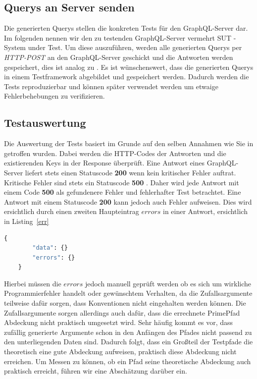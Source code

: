 \subsection{Querys an Server senden}
\label{testf}

Die generierten Querys stellen die konkreten Tests für den GraphQL-Server dar.
Im folgenden nennen wir den zu testenden GraphQL-Server vermehrt SUT - System under Test.
Um diese auszuführen, werden alle generierten Querys per \textit{HTTP-POST} an den GraphQL-Server geschickt und die Antworten
werden gespeichert, dies ist analog zu \cite{property-based-testing}.
Es ist wünschenswert, dass die generierten Querys in einem Testframework abgebildet und gespeichert werden.
Dadurch werden die Tests reproduzierbar und können später verwendet werden um etwaige Fehlerbehebungen zu verifizieren.

\subsection{Testauswertung}

Die Auswertung der Tests basiert im Grunde auf den selben Annahmen wie Sie in \cite{property-based-testing} getroffen wurden.
Dabei werden die HTTP-Codes der Antworten und die existierenden Keys in der Response überprüft.
Eine Antwort eines GraphQL-Server liefert stets einen Statuscode \textbf{200} wenn kein kritischer Fehler auftrat.
Kritische Fehler sind stets ein Statuscode \textbf{500} \cite[vgl. 7. Response]{graphqlspecification}.
Daher wird jede Antwort mit einem Code \textbf{500} als gefundenere Fehler und fehlerhafter Test betrachtet.
Eine Antwort mit einem Statuscode \textbf{200} kann jedoch auch Fehler aufweisen.
Dies wird ersichtlich durch einen zweiten Haupteintrag $errors$ in einer Antwort, ersichtlich in Listing~\ref{err}

\begin{lstlisting}[language=GraphQL, label={err}, caption={fehlerhafte Antwort}]
    {
        "data": {}
        "errors": {}
    }
\end{lstlisting}

Hierbei müssen die $errors$ jedoch manuell geprüft werden ob es sich um wirkliche Programmierfehler handelt oder gewünschtem Verhalten,
da die Zufallsargumente teilweise dafür sorgen, dass Konventionen nicht eingehalten werden können.
Die Zufallsargumente sorgen allerdings auch dafür, dass die errechnete PrimePfad Abdeckung nicht praktisch umgesetzt wird.
Sehr häufig kommt es vor, dass zufällig generierte Argumente schon in den Anfängen des Pfades nicht passend zu den unterliegenden Daten sind.
Dadurch folgt, dass ein Großteil der Testpfade die theoretisch eine gute Abdeckung aufweisen, praktisch diese Abdeckung nicht erreichen.
Um Messen zu können, ob ein Pfad seine theoretische Abdeckung auch praktisch erreicht, führen wir eine Abschätzung darüber ein.

